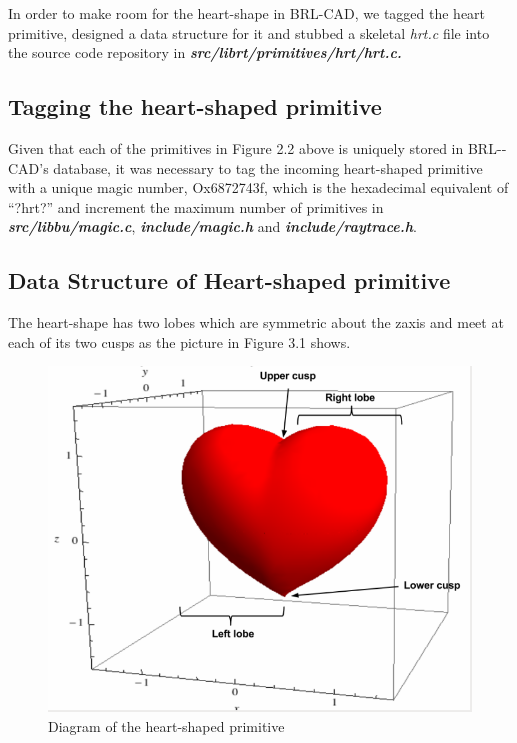 In   order   to   make   room   for   the   heart­-shape   in   BRL-­CAD,   we   tagged   the   heart  
primitive,   designed   a   data   structure   for   it   and   stubbed   a   skeletal   \textit{hrt.c}   file   into  
the source code repository in \textbf{\textit{src/librt/primitives/hrt/hrt.c.}}

\subsection{Tagging the heart­-shaped primitive}

Given   that   each   of   the   primitives   in   Figure   2.2   above   is   uniquely   stored   in  
BRL-­CAD's   database,   it   was   necessary   to   tag   the   incoming   heart-­shaped  
primitive   with   a   unique   magic   number,   Ox6872743f,   which   is   the   hexadecimal  
equivalent   of   “?hrt?”   and   increment   the   maximum   number   of   primitives   in  
\textbf{\textit{src/libbu/magic.c}}, \textbf{\textit{include/magic.h}} and \textbf{\textit{include/raytrace.h}}.  

\subsection{Data Structure of Heart-shaped primitive }

\hspace{30} The   heart-­shape   has   two   lobes   which   are   symmetric   about   the   z­axis   and  
meet at each of its two cusps as the picture in Figure 3.1 shows.  

\begin{figure}[htbp]
\centering
\includegraphics[trim=0.0cm 0.5cm 0.1cm 0.1cm, clip=true, totalheight=0.4\textheight]{Pictures/Heart.png}
\caption[Diagram of the heart-shaped primitive]{Diagram of the heart-shaped primitive}
\label{Heart}
\end{figure}

